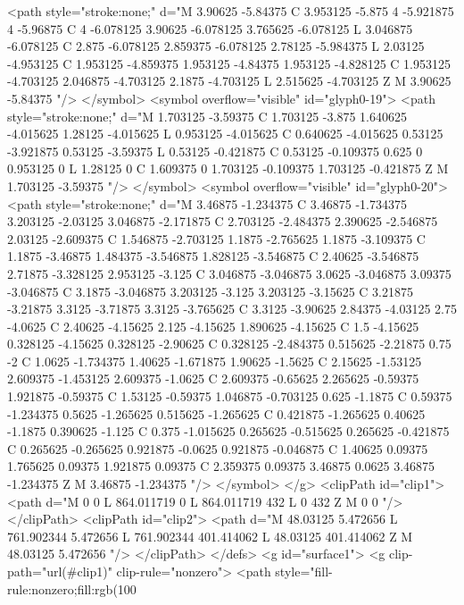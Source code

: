 <path style="stroke:none;" d="M 3.90625 -5.84375 C 3.953125 -5.875 4 -5.921875 4 -5.96875 C 4 -6.078125 3.90625 -6.078125 3.765625 -6.078125 L 3.046875 -6.078125 C 2.875 -6.078125 2.859375 -6.078125 2.78125 -5.984375 L 2.03125 -4.953125 C 1.953125 -4.859375 1.953125 -4.84375 1.953125 -4.828125 C 1.953125 -4.703125 2.046875 -4.703125 2.1875 -4.703125 L 2.515625 -4.703125 Z M 3.90625 -5.84375 "/>
</symbol>
<symbol overflow="visible" id="glyph0-19">
<path style="stroke:none;" d="M 1.703125 -3.59375 C 1.703125 -3.875 1.640625 -4.015625 1.28125 -4.015625 L 0.953125 -4.015625 C 0.640625 -4.015625 0.53125 -3.921875 0.53125 -3.59375 L 0.53125 -0.421875 C 0.53125 -0.109375 0.625 0 0.953125 0 L 1.28125 0 C 1.609375 0 1.703125 -0.109375 1.703125 -0.421875 Z M 1.703125 -3.59375 "/>
</symbol>
<symbol overflow="visible" id="glyph0-20">
<path style="stroke:none;" d="M 3.46875 -1.234375 C 3.46875 -1.734375 3.203125 -2.03125 3.046875 -2.171875 C 2.703125 -2.484375 2.390625 -2.546875 2.03125 -2.609375 C 1.546875 -2.703125 1.1875 -2.765625 1.1875 -3.109375 C 1.1875 -3.46875 1.484375 -3.546875 1.828125 -3.546875 C 2.40625 -3.546875 2.71875 -3.328125 2.953125 -3.125 C 3.046875 -3.046875 3.0625 -3.046875 3.09375 -3.046875 C 3.1875 -3.046875 3.203125 -3.125 3.203125 -3.15625 C 3.21875 -3.21875 3.3125 -3.71875 3.3125 -3.765625 C 3.3125 -3.90625 2.84375 -4.03125 2.75 -4.0625 C 2.40625 -4.15625 2.125 -4.15625 1.890625 -4.15625 C 1.5 -4.15625 0.328125 -4.15625 0.328125 -2.90625 C 0.328125 -2.484375 0.515625 -2.21875 0.75 -2 C 1.0625 -1.734375 1.40625 -1.671875 1.90625 -1.5625 C 2.15625 -1.53125 2.609375 -1.453125 2.609375 -1.0625 C 2.609375 -0.65625 2.265625 -0.59375 1.921875 -0.59375 C 1.53125 -0.59375 1.046875 -0.703125 0.625 -1.1875 C 0.59375 -1.234375 0.5625 -1.265625 0.515625 -1.265625 C 0.421875 -1.265625 0.40625 -1.1875 0.390625 -1.125 C 0.375 -1.015625 0.265625 -0.515625 0.265625 -0.421875 C 0.265625 -0.265625 0.921875 -0.0625 0.921875 -0.046875 C 1.40625 0.09375 1.765625 0.09375 1.921875 0.09375 C 2.359375 0.09375 3.46875 0.0625 3.46875 -1.234375 Z M 3.46875 -1.234375 "/>
</symbol>
</g>
<clipPath id="clip1">
  <path d="M 0 0 L 864.011719 0 L 864.011719 432 L 0 432 Z M 0 0 "/>
</clipPath>
<clipPath id="clip2">
  <path d="M 48.03125 5.472656 L 761.902344 5.472656 L 761.902344 401.414062 L 48.03125 401.414062 Z M 48.03125 5.472656 "/>
</clipPath>
</defs>
<g id="surface1">
<g clip-path="url(#clip1)" clip-rule="nonzero">
<path style="fill-rule:nonzero;fill:rgb(100%

